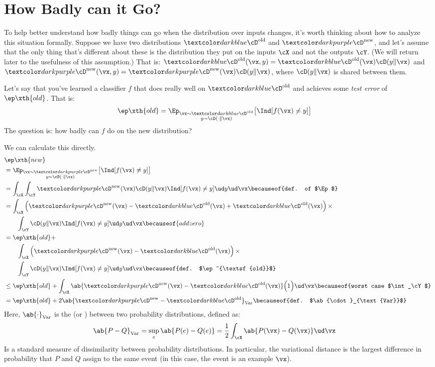 \section{How Badly can it Go?}

To help better understand how badly things can go when the distribution over inputs changes, it's worth thinking about how to analyze this situation formally.
Suppose we have two distributions $\Dold$ and $\Dnew$, and let's assume that the only thing that's different about these is the distribution they put on the inputs $\cX$ and not the outputs $\cY$.
(We will return later to the usefulness of this assumption.)
That is: $\Dold(\vx,y) = \Dold(\vx) \cD(y \| \vx)$ and $\Dnew(\vx,y) = \Dnew(\vx) \cD(y \| \vx)$, where $\cD(y \| \vx)$ is shared between them.

Let's say that you've learned a classifier $f$ that does really well on $\Dold$ and achieves some \emph{test error} of $\ep\xth{old}$.
That is:
%
\begin{align}
  \ep\xth{old} &= \Ep_{\substack{\vx \sim \Dold\\y \sim \cD(\cdot \| \vx)}}\big[ \Ind[f(\vx) \neq y] \big]
\end{align}
%
The question is: how badly can $f$ do on the new distribution?

We can calculate this directly.
%
\begin{align}
  & \ep\xth{new} \nonumber \\
  &= \Ep_{\substack{\vx \sim \Dnew\\y \sim \cD(\cdot \| \vx)}}\big[ \Ind[f(\vx) \neq y] \big] \\
  &= \int_\cX \int_\cY \Dnew(\vx) \cD(y \| \vx) \Ind[f(\vx) \neq y] \ud y \ud \vx \becauseof{def. of $\Ep$} \\
  &= \int_\cX \left( \Dnew(\vx) - \Dold(\vx) + \Dold(\vx) \right)\times \nonumber\\
& \qquad \int_\cY \cD(y \| \vx) \Ind[f(\vx) \neq y] \ud y \ud \vx  \becauseof{add zero} \\
  &= \ep\xth{old} + \nonumber\\
  &\qquad \int_\cX \left( \Dnew(\vx) - \Dold(\vx)\right) \times \nonumber\\
  &\qquad\int_\cY \cD(y \| \vx) \Ind[f(\vx) \neq y] \ud y \ud \vx  \becauseof{def. $\ep^{\textsf{old}}$} \\
&\leq \ep\xth{old} + \int_\cX \ab{\Dnew(\vx) - \Dold(\vx)} \Big( 1 \Big) \ud \vx  \becauseof{worst case $\int_\cY$} \\
  &= \ep\xth{old} + 2 \ab{\Dnew - \Dold}_{\text{Var}} \becauseof{def. $\ab{\cdot}_{\text{Var}}$}
\end{align}
%
Here, $\ab{\cdot}_{\text{Var}}$ is the  (or ) between two probability distributions, defined as:
%
\begin{align}
  \ab{P - Q}_{\text{Var}}
  &= \sup_{e} \ab{P(e) - Q(e)}
  = \frac 1 2 \int_\cX \ab{P(\vx) - Q(\vx)} \ud \vx
\end{align}
%
Is a standard measure of dissimilarity between probability distributions. In particular, the variational distance is the largest difference in probability that $P$ and $Q$ assign to the same event (in this case, the event is an example $\vx$).

